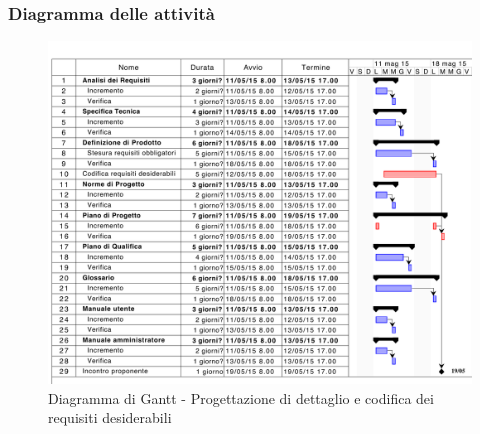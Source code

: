 		\subsubsection{Diagramma delle attività} %
		\label{ssub:diagramma_delle_attivita}
			\begin{figure}[htbp]
				\centering
				\centerline{\includegraphics[scale=0.7]{images/d_attivita_prog_dett_cod_des.pdf}}
				\caption{Diagramma di Gantt - Progettazione di dettaglio e codifica dei requisiti desiderabili}
				\label{fig:gantt_prog_dett_cod_requisiti_desiderabili}				
			\end{figure}
	
